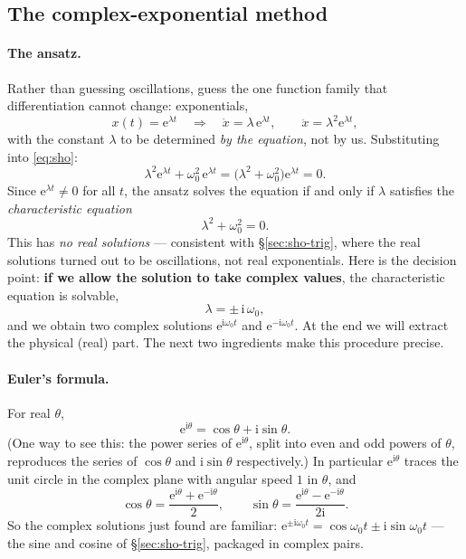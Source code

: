 \documentclass[11pt]{article}
\theoremstyle{plain}
\theoremstyle{definition}
\theoremstyle{remark}
\newcommand{\ee}{\mathrm{e}}
\newcommand{\ii}{\mathrm{i}}
\begin{document}
\subsection{The complex-exponential method}
\label{sec:complex-method}

\paragraph{The ansatz.}
Rather than guessing oscillations, guess the one function family that
differentiation cannot change: exponentials,
\begin{equation}
  x(t) = \ee^{\lambda t}
  \quad\Longrightarrow\quad
  \dot x = \lambda\, \ee^{\lambda t},
  \qquad
  \ddot x = \lambda^2 \ee^{\lambda t},
\end{equation}
with the constant $\lambda$ to be determined \emph{by the equation}, not by
us. Substituting into \eqref{eq:sho}:
\begin{equation}
  \lambda^2 \ee^{\lambda t} + \omega_0^2\, \ee^{\lambda t}
  = \bigl(\lambda^2 + \omega_0^2\bigr)\ee^{\lambda t} = 0 .
\end{equation}
Since $\ee^{\lambda t}\neq 0$ for all $t$, the ansatz solves the equation if
and only if $\lambda$ satisfies the \emph{characteristic equation}
\begin{equation}
  \lambda^2 + \omega_0^2 = 0 .
  \label{eq:sho-char}
\end{equation}
This has \emph{no real solutions} --- consistent with \S\ref{sec:sho-trig},
where the real solutions turned out to be oscillations, not real
exponentials. Here is the decision point: \textbf{if we allow the solution
to take complex values}, the characteristic equation is solvable,
\begin{equation}
  \lambda = \pm\,\ii\,\omega_0 ,
\end{equation}
and we obtain two complex solutions $\ee^{\ii\omega_0 t}$ and
$\ee^{-\ii\omega_0 t}$. At the end we will extract the physical (real) part.
The next two ingredients make this procedure precise.

\paragraph{Euler's formula.}
For real $\theta$,
\begin{equation}
  \ee^{\ii\theta} = \cos\theta + \ii\sin\theta .
  \label{eq:euler}
\end{equation}
(One way to see this: the power series of $\ee^{\ii\theta}$, split into even
and odd powers of $\theta$, reproduces the series of $\cos\theta$ and
$\ii\sin\theta$ respectively.) In particular $\ee^{\ii\theta}$ traces the unit
circle in the complex plane with angular speed $1$ in $\theta$, and
\begin{equation}
  \cos\theta = \frac{\ee^{\ii\theta}+\ee^{-\ii\theta}}{2},
  \qquad
  \sin\theta = \frac{\ee^{\ii\theta}-\ee^{-\ii\theta}}{2\ii}.
  \label{eq:euler-inverse}
\end{equation}
So the complex solutions just found are familiar:
$\ee^{\pm\ii\omega_0 t} = \cos\omega_0 t \pm \ii\sin\omega_0 t$ ---
the sine and cosine of \S\ref{sec:sho-trig}, packaged in complex pairs.
\end{document}
